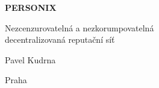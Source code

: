 \thispagestyle{empty}
\begin{center}
  {\sffamily\bfseries\fontsize{34}{40}\selectfont PERSONIX\par}
  \vspace{2.2em}
  {\rmfamily\large Nezcenzurovatelná a nezkorumpovatelná\\[0.25em]
   decentralizovaná reputační síť\par}
\end{center}
\begin{center}
  {\rmfamily\Large Pavel Kudrna\par}
  \vspace{0.45em}
  {\rmfamily\small Praha\quad\textbullet{}\par}
\end{center}
\clearpage
